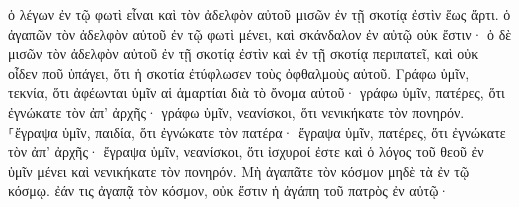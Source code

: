 \documentclass{openreader}
\begin{document}
ὁ λέγων ἐν τῷ φωτὶ εἶναι καὶ τὸν ἀδελφὸν αὐτοῦ μισῶν ἐν τῇ σκοτίᾳ ἐστὶν ἕως ἄρτι. 
ὁ ἀγαπῶν τὸν ἀδελφὸν αὐτοῦ ἐν τῷ φωτὶ μένει, καὶ σκάνδαλον ἐν αὐτῷ οὐκ ἔστιν· 
ὁ δὲ μισῶν τὸν ἀδελφὸν αὐτοῦ ἐν τῇ σκοτίᾳ ἐστὶν καὶ ἐν τῇ σκοτίᾳ περιπατεῖ, καὶ οὐκ οἶδεν ποῦ ὑπάγει, ὅτι ἡ σκοτία ἐτύφλωσεν τοὺς ὀφθαλμοὺς αὐτοῦ. 
Γράφω ὑμῖν, τεκνία, ὅτι ἀφέωνται ὑμῖν αἱ ἁμαρτίαι διὰ τὸ ὄνομα αὐτοῦ· 
γράφω ὑμῖν, πατέρες, ὅτι ἐγνώκατε τὸν ἀπ’ ἀρχῆς· γράφω ὑμῖν, νεανίσκοι, ὅτι νενικήκατε τὸν πονηρόν. 
⸀ἔγραψα ὑμῖν, παιδία, ὅτι ἐγνώκατε τὸν πατέρα· ἔγραψα ὑμῖν, πατέρες, ὅτι ἐγνώκατε τὸν ἀπ’ ἀρχῆς· ἔγραψα ὑμῖν, νεανίσκοι, ὅτι ἰσχυροί ἐστε καὶ ὁ λόγος τοῦ θεοῦ ἐν ὑμῖν μένει καὶ νενικήκατε τὸν πονηρόν. 
Μὴ ἀγαπᾶτε τὸν κόσμον μηδὲ τὰ ἐν τῷ κόσμῳ. ἐάν τις ἀγαπᾷ τὸν κόσμον, οὐκ ἔστιν ἡ ἀγάπη τοῦ πατρὸς ἐν αὐτῷ· 
\end{document}
